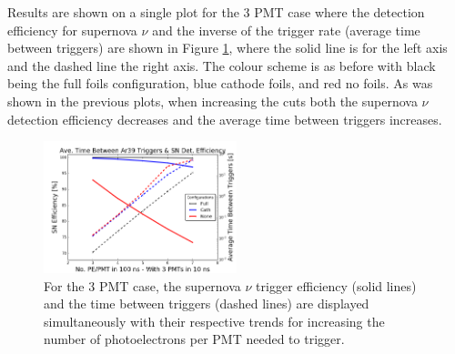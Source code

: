 \documentclass[a4paper]{article}
\begin{document}


Results are shown on a single plot for the 3 PMT case where the detection efficiency for supernova $\nu$ and the inverse of the trigger rate (average time between triggers) are shown in Figure \ref{efficiency_trigger_twinaxis}, where the solid line is for the left axis and the dashed line the right axis. The colour scheme is as before with black being the full foils configuration, blue cathode foils, and red no foils. As was shown in the previous plots, when increasing the cuts both the supernova $\nu$ detection efficiency decreases and the average time between triggers increases.

\begin{figure}[H]
\center
\includegraphics[width=0.5\textwidth]{updated_efficiency_purity_labels.png}
\caption{For the 3 PMT case, the supernova $\nu$ trigger efficiency (solid lines) and the time between triggers (dashed lines) are displayed simultaneously with their respective trends for increasing the number of photoelectrons per PMT needed to trigger.}\label{efficiency_trigger_twinaxis}
\end{figure}
\end{document}

